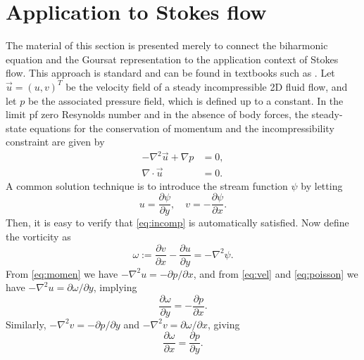 \documentclass{article}
\begin{document}
\section{Application to Stokes flow \label{sec:physics}}

The material of this section is presented merely to connect the biharmonic
equation and the Goursat representation to the application context of Stokes
flow. This approach is standard and can be found in textbooks such as
\cite{ockendon95}. Let $\vec{u}=(u,v)^T$ be the velocity field of a steady
incompressible 2D fluid flow, and let $p$ be the associated pressure field,
which is defined up to a constant. In the limit pf zero Resynolds number and in
the absence of body forces, the steady-state equations for the conservation of
momentum and the incompressibility constraint are given by
\begin{subequations}\label{eq:stokes}
\begin{align}
-\nabla^2 \vec{u} + \nabla p &= 0,\label{eq:momen}\\
\nabla\cdot\vec{u} &= 0. \label{eq:incomp}
\end{align}
\end{subequations}
A common solution technique is to introduce the stream function $\psi$ by letting
\begin{equation}\label{eq:vel}
u=\frac{\partial\psi}{\partial y}, \quad 
v=-\frac{\partial\psi}{\partial x}.
\end{equation}
Then, it is easy to verify that \eqref{eq:incomp} is automatically satisfied.
Now define the vorticity as
\begin{equation} \label{eq:poisson}
\omega := \frac{\partial v}{\partial x} - \frac{\partial u}{\partial y}  = -\nabla^2 \psi.
\end{equation}
From \eqref{eq:momen} we have $-\nabla^2 u = -\partial p/\partial x$, and from
\eqref{eq:vel} and \eqref{eq:poisson} we have $-\nabla^2 u
=\partial\omega/\partial y$, implying 
\begin{equation}
\frac{\partial \omega}{\partial y} = -\frac{\partial p}{\partial x}.
\end{equation}
Similarly, $-\nabla^2 v=-\partial p/\partial y$ and $-\nabla^2 v =\partial
\omega/\partial x$, giving
\begin{equation}
\frac{\partial\omega}{\partial x}=\frac{\partial p}{\partial y}.
\end{equation}
\end{document}
